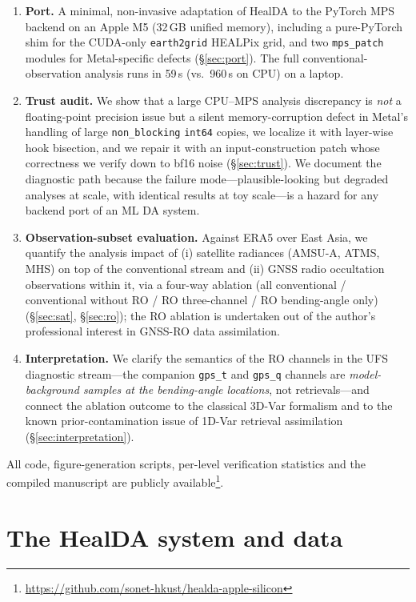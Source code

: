 \documentclass[twocolumn,11pt]{article}
\begin{document}
\begin{enumerate}
\item \textbf{Port.} A minimal, non-invasive adaptation of HealDA to
the PyTorch MPS backend on an Apple M5 (32\,GB unified memory),
including a pure-PyTorch shim for the CUDA-only \texttt{earth2grid}
HEALPix grid, and two \texttt{mps\_patch} modules for Metal-specific
defects (\S\ref{sec:port}). The full conventional-observation analysis
runs in 59\,s (vs.\ 960\,s on CPU) on a laptop.
\item \textbf{Trust audit.} We show that a large CPU--MPS analysis
discrepancy is \emph{not} a floating-point precision issue but a
silent memory-corruption defect in Metal's handling of large
\texttt{non\_blocking} \texttt{int64} copies, we localize it with
layer-wise hook bisection, and we repair it with an input-construction
patch whose correctness we verify down to bf16 noise
(\S\ref{sec:trust}). We document the diagnostic path because the
failure mode---plausible-looking but degraded analyses at scale, with
identical results at toy scale---is a hazard for any backend port of
an ML DA system.
\item \textbf{Observation-subset evaluation.} Against ERA5 over East
Asia, we quantify the analysis impact of (i) satellite radiances
(AMSU-A, ATMS, MHS) on top of the conventional stream and (ii) GNSS
radio occultation observations within it, via a four-way ablation
(all conventional / conventional without RO / RO three-channel /
RO bending-angle only) (\S\ref{sec:sat}, \S\ref{sec:ro}); the RO
ablation is undertaken out of the author's professional interest in
GNSS-RO data assimilation.
\item \textbf{Interpretation.} We clarify the semantics of the RO
channels in the UFS diagnostic stream---the companion \texttt{gps\_t}
and \texttt{gps\_q} channels are \emph{model-background samples at the
bending-angle locations}, not retrievals---and connect the ablation
outcome to the classical 3D-Var formalism
\citep{lorenc1986analysis,courtier1994strategy,daley1991atmospheric}
and to the known prior-contamination issue of 1D-Var retrieval
assimilation (\S\ref{sec:interpretation}).
\end{enumerate}

All code, figure-generation scripts, per-level verification statistics
and the compiled manuscript are publicly available\footnote{%
\url{https://github.com/sonet-hkust/healda-apple-silicon}}.

\section{The HealDA system and data}\label{sec:system}
\end{document}
